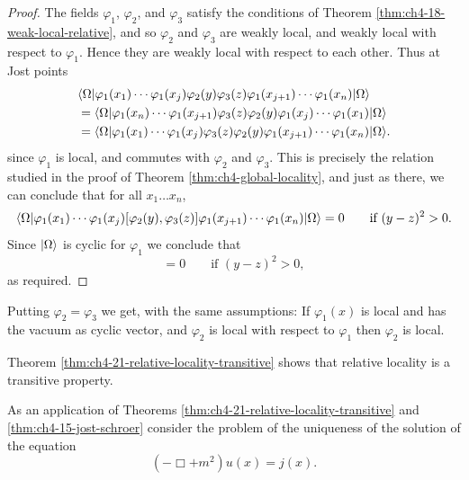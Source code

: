 \begin{proof}
The fields $\varphi_1$, $\varphi_2$, and $\varphi_3$ satisfy the conditions
of Theorem \ref{thm:ch4-18-weak-local-relative}, and so $\varphi_2$ and $\varphi_3$ are weakly local, and
weakly local with respect to $\varphi_1$. Hence they are weakly local with
respect to each other. Thus at Jost points
\begin{equation*}
\begin{aligned}
 &\langle \Omega\rvert\varphi_1(x_1)\cdots\varphi_1(x_j)
   \varphi_2(y)\varphi_3(z)\varphi_1(x_{j+1})\cdots
   \varphi_1(x_n)\lvert \Omega\rangle\\
 &=
   \langle \Omega\rvert\varphi_1(x_n)\cdots\varphi_1(x_{j+1})
   \varphi_3(z)\varphi_2(y)\varphi_1(x_j)\cdots
   \varphi_1(x_1)\lvert \Omega\rangle\\
 &=
   \langle \Omega\rvert\varphi_1(x_1)\cdots\varphi_1(x_j)
   \varphi_3(z)\varphi_2(y)\varphi_1(x_{j+1})\cdots
   \varphi_1(x_n)\lvert \Omega\rangle.
\end{aligned}
\end{equation*}
since $\varphi_1$ is local, and commutes with $\varphi_2$ and $\varphi_3$.
This is precisely the relation studied in the proof of Theorem \ref{thm:ch4-global-locality}, and just
as there, we can conclude that for all $x_1\ldots x_n$,
\begin{equation*}
  \langle \Omega\rvert\varphi_1(x_1)\cdots\varphi_1(x_j)
  [\varphi_2(y),\varphi_3(z)]
  \varphi_1(x_{j+1})\cdots\varphi_1(x_n)\lvert \Omega\rangle=0
  \qquad \text{if }(y-z)^2>0.
\end{equation*}
Since $\lvert \Omega\rangle$ is cyclic for $\varphi_1$ we conclude that
\begin{equation*}
  [\varphi_2(y),\varphi_3(z)]=0
  \qquad \text{if }(y-z)^2>0,
\end{equation*}
as required.
\end{proof}

\begin{corollary*}
Putting $\varphi_2=\varphi_3$ we get, with the same assumptions:
If $\varphi_1(x)$ is local and has the vacuum as cyclic vector, and
$\varphi_2$ is local with respect to $\varphi_1$ then $\varphi_2$ is local.
\end{corollary*}

Theorem \ref{thm:ch4-21-relative-locality-transitive} shows that relative locality is a transitive property.

As an application of Theorems \ref{thm:ch4-21-relative-locality-transitive} and \ref{thm:ch4-15-jost-schroer} consider the problem of the
uniqueness of the solution of the equation
\begin{equation*}
  (-\Box+m^2)u(x)=j(x).
\end{equation*}

